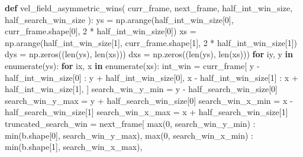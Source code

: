 \documentclass[
  english,
  letterpaper,
  numbers=noendperiod,
  DIV=13]{scrreprt}
\newenvironment{Shaded}{\begin{snugshade}}{\end{snugshade}}
\newcommand{\BuiltInTok}[1]{\textcolor[rgb]{0.00,0.23,0.31}{#1}}
\newcommand{\ControlFlowTok}[1]{\textcolor[rgb]{0.00,0.23,0.31}{\textbf{#1}}}
\newcommand{\DecValTok}[1]{\textcolor[rgb]{0.68,0.00,0.00}{#1}}
\newcommand{\KeywordTok}[1]{\textcolor[rgb]{0.00,0.23,0.31}{\textbf{#1}}}
\newcommand{\NormalTok}[1]{\textcolor[rgb]{0.00,0.23,0.31}{#1}}
\newcommand{\OperatorTok}[1]{\textcolor[rgb]{0.37,0.37,0.37}{#1}}
\begin{document}
\begin{Shaded}
\begin{Highlighting}[]
\KeywordTok{def}\NormalTok{ vel\_field\_asymmetric\_wins(}
\NormalTok{    curr\_frame, next\_frame, half\_int\_win\_size, half\_search\_win\_size}
\NormalTok{):}
\NormalTok{    ys }\OperatorTok{=}\NormalTok{ np.arange(half\_int\_win\_size[}\DecValTok{0}\NormalTok{], curr\_frame.shape[}\DecValTok{0}\NormalTok{], }\DecValTok{2} \OperatorTok{*}\NormalTok{ half\_int\_win\_size[}\DecValTok{0}\NormalTok{])}
\NormalTok{    xs }\OperatorTok{=}\NormalTok{ np.arange(half\_int\_win\_size[}\DecValTok{1}\NormalTok{], curr\_frame.shape[}\DecValTok{1}\NormalTok{], }\DecValTok{2} \OperatorTok{*}\NormalTok{ half\_int\_win\_size[}\DecValTok{1}\NormalTok{])}
\NormalTok{    dys }\OperatorTok{=}\NormalTok{ np.zeros((}\BuiltInTok{len}\NormalTok{(ys), }\BuiltInTok{len}\NormalTok{(xs)))}
\NormalTok{    dxs }\OperatorTok{=}\NormalTok{ np.zeros((}\BuiltInTok{len}\NormalTok{(ys), }\BuiltInTok{len}\NormalTok{(xs)))}
    \ControlFlowTok{for}\NormalTok{ iy, y }\KeywordTok{in} \BuiltInTok{enumerate}\NormalTok{(ys):}
        \ControlFlowTok{for}\NormalTok{ ix, x }\KeywordTok{in} \BuiltInTok{enumerate}\NormalTok{(xs):}
\NormalTok{            int\_win }\OperatorTok{=}\NormalTok{ curr\_frame[}
\NormalTok{                y }\OperatorTok{{-}}\NormalTok{ half\_int\_win\_size[}\DecValTok{0}\NormalTok{] : y }\OperatorTok{+}\NormalTok{ half\_int\_win\_size[}\DecValTok{0}\NormalTok{],}
\NormalTok{                x }\OperatorTok{{-}}\NormalTok{ half\_int\_win\_size[}\DecValTok{1}\NormalTok{] : x }\OperatorTok{+}\NormalTok{ half\_int\_win\_size[}\DecValTok{1}\NormalTok{],}
\NormalTok{            ]}
\NormalTok{            search\_win\_y\_min }\OperatorTok{=}\NormalTok{ y }\OperatorTok{{-}}\NormalTok{ half\_search\_win\_size[}\DecValTok{0}\NormalTok{]}
\NormalTok{            search\_win\_y\_max }\OperatorTok{=}\NormalTok{ y }\OperatorTok{+}\NormalTok{ half\_search\_win\_size[}\DecValTok{0}\NormalTok{]}
\NormalTok{            search\_win\_x\_min }\OperatorTok{=}\NormalTok{ x }\OperatorTok{{-}}\NormalTok{ half\_search\_win\_size[}\DecValTok{1}\NormalTok{]}
\NormalTok{            search\_win\_x\_max }\OperatorTok{=}\NormalTok{ x }\OperatorTok{+}\NormalTok{ half\_search\_win\_size[}\DecValTok{1}\NormalTok{]}
\NormalTok{            truncated\_search\_win }\OperatorTok{=}\NormalTok{ next\_frame[}
                \BuiltInTok{max}\NormalTok{(}\DecValTok{0}\NormalTok{, search\_win\_y\_min) : }\BuiltInTok{min}\NormalTok{(b.shape[}\DecValTok{0}\NormalTok{], search\_win\_y\_max),}
                \BuiltInTok{max}\NormalTok{(}\DecValTok{0}\NormalTok{, search\_win\_x\_min) : }\BuiltInTok{min}\NormalTok{(b.shape[}\DecValTok{1}\NormalTok{], search\_win\_x\_max),}

\end{Highlighting}
\end{Shaded}
\end{document}
